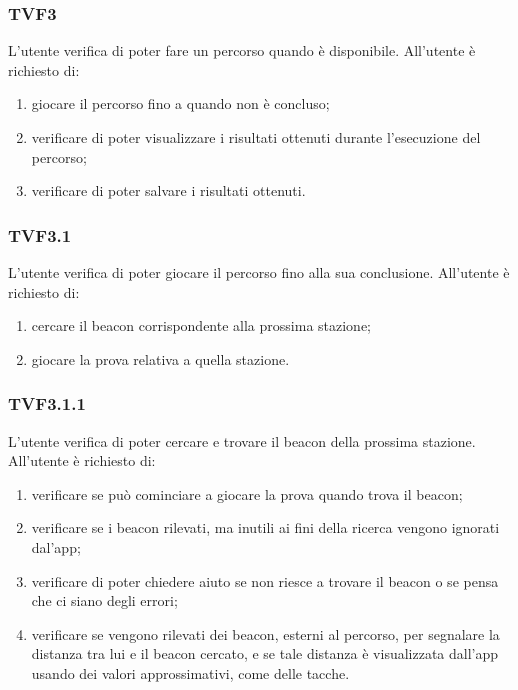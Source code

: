 		\subsubsection{TVF3}
			L'utente verifica di poter fare un percorso quando è disponibile.
			All'utente è richiesto di:
			\begin{enumerate}
				\item giocare il percorso fino a quando non è concluso;
				\item verificare di poter visualizzare i risultati ottenuti durante l'esecuzione del percorso;
				\item verificare di poter salvare i risultati ottenuti.
			\end{enumerate}
		\subsubsection{TVF3.1}
			L'utente verifica di poter giocare il percorso fino alla sua conclusione.
			All'utente è richiesto di:
			\begin{enumerate}
				\item cercare il beacon corrispondente alla prossima stazione;
				\item giocare la prova relativa a quella stazione.
			\end{enumerate}
		\subsubsection{TVF3.1.1}
			L'utente verifica di poter cercare e trovare il beacon della prossima stazione.
			All'utente è richiesto di:
			\begin{enumerate}
				\item verificare se può cominciare a giocare la prova quando trova il beacon;
				\item verificare se i beacon rilevati, ma inutili ai fini della ricerca vengono ignorati dal'app;
				\item verificare di poter chiedere aiuto se non riesce a trovare il beacon o se pensa che ci siano degli errori;
				\item verificare se vengono rilevati dei beacon, esterni al percorso, per segnalare la distanza tra lui e il beacon cercato, e se tale distanza è visualizzata dall'app usando dei valori approssimativi, come delle tacche.
			\end{enumerate}
